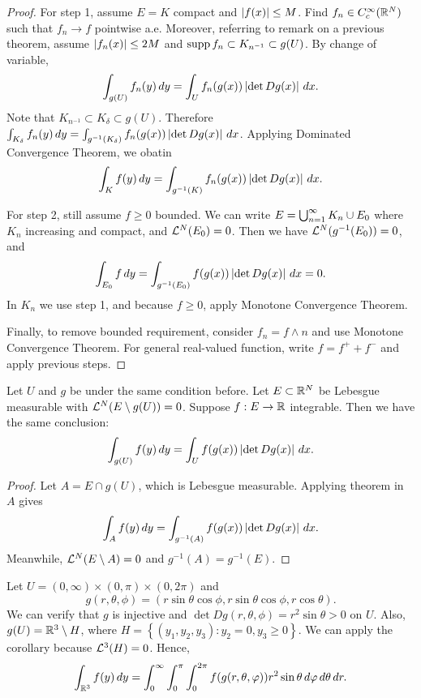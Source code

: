 \documentclass[a4paper]{article}
\begin{document}
\begin{proof}

  For step 1, assume $E = K$ compact and $\left\lvert f(x)\right\rvert \leq M$. Find $f_n
  \in C_c^\infty (\mathbb{R}^N)$ such that $f_n \to f$ pointwise a.e. Moreover,
  referring to remark on a previous theorem, assume $\left\lvert f_n(x)\right\rvert \leq 2M$
  and $\operatorname{supp} f_n \subset K_{n^{-1}} \subset g(U)$. By change of variable,
  \[
    \int_{g(U)}  f_n (y) \, d y = \int_U f_n (g(x)) \left\lvert \det Dg(x)\right\rvert \, d x.
  \]
  Note that $K_{n^{-1}} \subset K_\delta \subset g(U)$. Therefore
  $\int_{K_\delta} f_n (y) \, d y = \int_{g^{-1} (K_{\delta})} f_n(g(x))
  \left\lvert \det Dg(x)\right\rvert \, d x$. Applying Dominated Convergence Theorem, we
  obatin
  \[
    \int_K f(y) \, d y = \int_{g^{-1} (K)} f_n (g(x)) \left\lvert \det Dg(x)\right\rvert \, d x.
  \]

  For step 2, still assume $f \geq 0$ bounded. We can write $E = \bigcup_{n=1}^\infty
  K_n \cup E_0$ where $K_n$ increasing and compact, and $\mathcal{L}^N (E_0) = 0$.
  Then we have $\mathcal{L}^N (g^{-1} (E_0)) = 0$, and
  \[
    \int_{E_0}  f \, d y = \int_{g^{-1} (E_0)} f(g(x)) \left\lvert \det D g(x)\right\rvert \, d x = 0.
  \]
  In $K_n$ we use step 1, and because $f \geq 0$, apply Monotone
  Convergence Theorem.

  Finally, to remove bounded requirement, consider $f_n = f \wedge n$ and
  use Monotone Convergence Theorem. For general real-valued function,
  write $f = f^+ + f^-$ and apply previous steps.
\end{proof}

\begin{cor}

  Let $U$ and $g$ be under the same condition before. Let $E \subset \mathbb{R}^N$
  be Lebesgue measurable with $\mathcal{L}^N (E \setminus g(U)) = 0$. Suppose $f :
  E \to \mathbb{R}$ integrable. Then we have the same conclusion:
  \[
    \int_{g(U)}  f(y) \, d y = \int_U f(g(x)) \left\lvert \det Dg(x)\right\rvert \, d x.
  \]
\end{cor}

\begin{proof}

  Let $A = E \cap g(U)$, which is Lebesgue measurable. Applying theorem in
  $A$ gives
  \[
    \int_A f(y) \, d y = \int_{g^{-1}(A)}  f(g(x)) \left\lvert \det Dg(x)\right\rvert \, d x.
  \]
  Meanwhile, $\mathcal{L}^N (E \setminus A) = 0$ and $g^{-1} (A) = g^{-1} (E)$.
\end{proof}

\begin{eg}
  Let $U = (0, \infty) \times (0, \pi) \times (0, 2 \pi)$ and
  \[
    g(r, \theta, \phi) = (r \sin \theta \cos \phi, r \sin \theta \cos \phi,
    r \cos \theta).
  \]
  We can verify that $g$ is injective and $\det Dg(r, \theta, \phi) = r^2
  \sin \theta > 0$ on $U$. Also, $g(U) = \mathbb{R}^3 \setminus H$, where $H =
  \left\{ (y_1, y_2, y_3) : y_2 = 0, y_3 \geq 0 \right\}$. We can apply
  the corollary because $\mathcal{L}^3 (H) = 0$. Hence,
  \[
    \int_{\mathbb{R}^3}  f(y) \, d y = \int_0^\infty \int_0^\pi \int_0^{2 \pi}
    f(g(r, \theta, \varphi)) r^2 \sin \theta \, d \varphi \, d \theta \, d r.
  \]
\end{eg}
\end{document}
